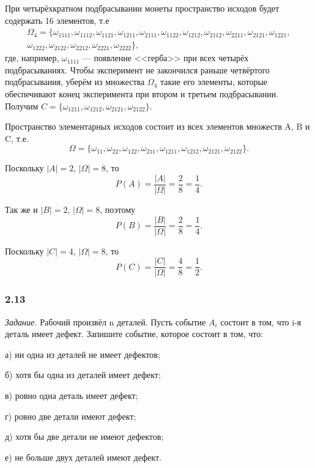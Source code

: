 \documentclass{book}
\begin{document}
При четырёхкратном подбрасывании монеты пространство исходов будет содержать 16 элементов, т.е
\begin{equation*}
\begin{split}
\Omega_4 =
\{ \omega_{1111}, \omega_{1112}, \omega_{1121}, \omega_{1211}, \omega_{2111}, \omega_{1122}, \omega_{1212}, \omega_{2112}, \omega_{2211}, \omega_{2121}, \omega_{1221}, \\
\omega_{1222}, \omega_{2122}, \omega_{2212}, \omega_{2221}, \omega_{2222}\},
\end{split}
\end{equation*}
где, например, $ \omega_{1111} $ --- появление <<герба>> при всех четырёх подбрасываниях.
Чтобы эксперимент не закончился раньше четвёртого подбрасывания, уберём из множества
$ \Omega_4 $ такие его элементы, которые обеспечивают конец эксперимента при втором и третьем подбрасывании.
Получим $ C = \{ \omega_{1211}, \omega_{1212}, \omega_{2121}, \omega_{2122} \} $.

Пространство элементарных исходов состоит из всех элементов множеств A, B и C, т.е.
$$ \Omega =
\{ \omega_{11}, \omega_{22}, \omega_{122}, \omega_{211}, \omega_{1211}, \omega_{1212}, \omega_{2121}, \omega_{2122} \}.$$

Поскольку $ |A| = 2 $, $ |\Omega| = 8 $, то
$$ P(A) =
\frac{ |A| }{ |\Omega| } =
\frac{2}{8} =
\frac{1}{4}.$$

Так же и $ |B| = 2 $, $ |\Omega| = 8 $, поэтому
$$ P(B) =
\frac{ |B| }{ |\Omega| } =
\frac{2}{8} =
\frac{1}{4}.$$

Поскольку $ |C| = 4 $, $ |\Omega| = 8 $, то
$$ P(C) =
\frac{ |C| }{ |\Omega| } =
\frac{4}{8} =
\frac{1}{2}.$$

\subsubsection*{2.13}

\textit{Задание.} Рабочий произвёл n деталей.
Пусть событие $ A_i $ состоит в том, что i-я деталь имеет дефект.
Запишите событие, которое состоит в том, что:

а) ни одна из деталей не имеет дефектов;

б) хотя бы одна из деталей имеет дефект;

в) ровно одна деталь имеет дефект;

г) ровно две детали имеют дефект;

д) хотя бы две детали не имеют дефектов;

е) не больше двух деталей имеют дефект.
\end{document}
